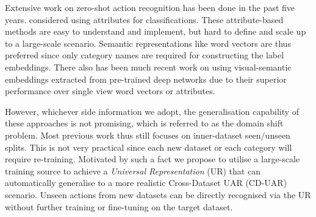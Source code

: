 \documentclass[10pt,twocolumn,letterpaper]{article}
\begin{document}
Extensive work on zero-shot action recognition has been done in the past five years. \cite{2011_Liu_zsl_action,latent_attr_Fu_PAMI13,mutlisource_zs_Gan_CVPR16,myACMMM,my_2017_PAMI} considered using attributes for classifications. These attribute-based methods are easy to understand and implement, but hard to define and scale up to a large-scale scenario. Semantic representations like word vectors \cite{tme_zs_Fu_ECCV14,synonyms_Alexiou_ICIP2016,myAAAI_18} are thus preferred since only category names are required for constructing the label embeddings. There also has been much recent work on using visual-semantic embeddings extracted from pre-trained deep networks \cite{2015_ICCV_ZSL_detection,object_scene_Wu_CVPR16,2017_ICCV_Spatial_aware} due to their superior performance over single view word vectors or attributes. 

However, whichever side information we adopt, the generalisation capability of these approaches is not promising, which is referred to as the domain shift problem. Most previous work thus still focuses on inner-dataset seen/unseen splits. This is not very practical since each new dataset or each category will require re-training. Motivated by such a fact we propose to utilise a large-scale training source to achieve a \textit{Universal Representation} (UR) that can automatically generalise to a more realistic Cross-Dataset UAR (CD-UAR) scenario. Unseen actions from new datasets can be directly recognised via the UR without further training or fine-tuning on the target dataset. 
\end{document}
